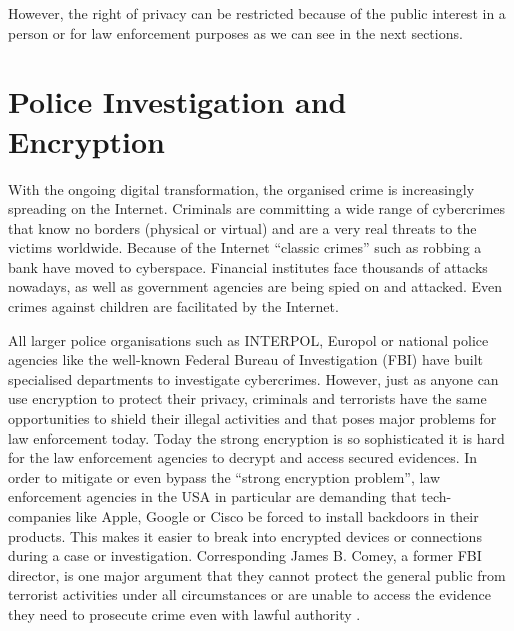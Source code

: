 \documentclass[a4paper, 11pt]{article}
\begin{document}
However, the right of privacy can be restricted because of the public interest in a person or for law enforcement purposes as we can see in the next sections.
\section*{Police Investigation and Encryption}
With the ongoing digital transformation, the organised crime is increasingly spreading on the Internet.
Criminals are committing a wide range of cybercrimes that know no borders (physical or virtual) and are a very real threats to the victims worldwide. Because of the Internet \enquote{classic crimes} such as robbing a bank have moved to cyberspace. Financial institutes face thousands of attacks nowadays, as well as government agencies are being spied on and attacked. Even crimes against children are facilitated by the Internet.
\par All larger police organisations such as INTERPOL, Europol or national police agencies like the well-known Federal Bureau of Investigation (FBI) have built specialised departments to investigate cybercrimes. However, just as anyone can use encryption to protect their privacy, criminals and terrorists have the same opportunities to shield their illegal activities and that poses major problems for law enforcement today. Today the strong encryption is so sophisticated it is hard for the law enforcement agencies to decrypt and access secured evidences. In order to mitigate or even bypass the \enquote{strong encryption problem}, law enforcement agencies in the USA in particular are demanding that tech-companies like Apple, Google or Cisco be forced to install backdoors in their products. This makes it easier to break into encrypted devices or connections during a case or investigation. Corresponding James B. Comey, a former FBI director, is one major argument that they cannot protect the general public from terrorist activities under all circumstances or are unable to access the evidence they need to prosecute crime even with lawful authority \cite{COMEY}. 
\end{document}
